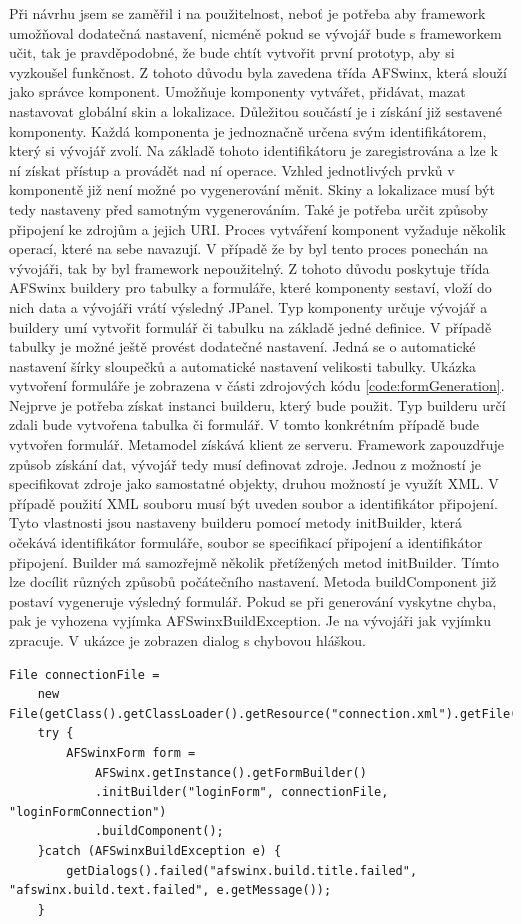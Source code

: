 Při návrhu jsem se zaměřil i na použitelnost, neboť je potřeba aby framework umožňoval dodatečná nastavení, nicméně pokud se vývojář bude s frameworkem učit, tak je pravděpodobné, že bude chtít vytvořit první prototyp, aby si vyzkoušel funkčnost. Z tohoto důvodu byla zavedena třída AFSwinx, která slouží jako správce komponent. Umožňuje komponenty vytvářet, přidávat, mazat nastavovat globální skin a lokalizace. Důležitou součástí je i získání již sestavené komponenty. Každá komponenta je jednoznačně určena svým identifikátorem, který si vývojář zvolí. Na základě tohoto identifikátoru je zaregistrována a lze k ní získat přístup a provádět nad ní operace. Vzhled jednotlivých prvků v komponentě již není možné po vygenerování měnit. Skiny a lokalizace musí být tedy nastaveny před samotným vygenerováním. Také je potřeba určit způsoby připojení ke zdrojům a jejich URI. Proces vytváření komponent vyžaduje několik operací, které na sebe navazují. V případě že by byl tento proces ponechán na vývojáři, tak by byl framework nepoužitelný. Z tohoto důvodu poskytuje třída AFSwinx buildery pro tabulky a formuláře, které komponenty sestaví, vloží do nich data a vývojáři vrátí výsledný JPanel. Typ komponenty určuje vývojář a buildery umí vytvořit formulář či tabulku na základě jedné definice. V případě tabulky je možné ještě provést dodatečné nastavení. Jedná se o automatické nastavení šírky sloupečků a automatické nastavení velikosti tabulky. Ukázka vytvoření formuláře je zobrazena v části zdrojových kódu \ref{code:formGeneration}. Nejprve je potřeba získat instanci builderu, který bude použit. Typ builderu určí zdali bude vytvořena tabulka či formulář. V tomto konkrétním případě bude vytvořen formulář. Metamodel získává klient ze serveru. Framework zapouzdřuje způsob získání dat, vývojář tedy musí definovat zdroje. Jednou z možností je specifikovat zdroje jako samostatné objekty, druhou možností je využít XML. V případě použití XML souboru musí být uveden soubor a identifikátor připojení. Tyto vlastnosti jsou nastaveny builderu pomocí metody initBuilder, která očekává identifikátor formuláře, soubor se specifikací připojení a identifikátor připojení. Builder má samozřejmě několik přetížených metod initBuilder. Tímto lze docílit různých způsobů počátečního nastavení. Metoda buildComponent již postaví vygeneruje výsledný formulář. Pokud se při generování vyskytne chyba, pak je vyhozena vyjímka AFSwinxBuildException. Je na vývojáři jak vyjímku zpracuje. V ukázce je zobrazen dialog s chybovou hláškou.

\begin{lstlisting}[caption={Generování formuláře na klientovi},
  label={code:formGeneration}]
File connectionFile =
	new File(getClass().getClassLoader().getResource("connection.xml").getFile());
	try {
		AFSwinxForm form =
			AFSwinx.getInstance().getFormBuilder()
			.initBuilder("loginForm", connectionFile, "loginFormConnection")
			.buildComponent();
	}catch (AFSwinxBuildException e) {
		getDialogs().failed("afswinx.build.title.failed", "afswinx.build.text.failed", e.getMessage());
	}
\end{lstlisting}


